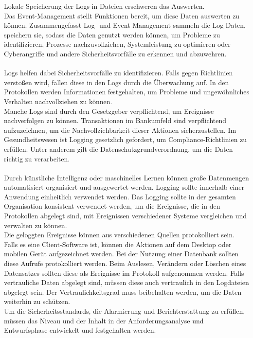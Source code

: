 Lokale Speicherung der Logs in Dateien erschweren das Auswerten.
\\
Das Event-Management stellt Funktionen bereit, um diese Daten auswerten zu können.
Zusammengefasst Log- und Event-Management sammeln die Log-Daten, speichern sie, sodass die Daten genutzt werden können, um Probleme zu identifizieren, Prozesse nachzuvollziehen, Systemleistung zu optimieren oder Cyberangriffe und andere Sicherheitsvorfälle zu erkennen und abzuwehren.
\\
\\
Logs helfen dabei Sicherheitsvorfälle zu identifizieren.
Falls gegen Richtlinien verstoßen wird, fallen diese in den Logs durch die Überwachung auf.
In den Protokollen werden Informationen festgehalten, um Probleme und ungewöhnliches Verhalten nachvollziehen zu können.
\\
Manche Logs sind durch den Gesetzgeber verpflichtend, um Ereignisse nachverfolgen zu können.
Transaktionen im Bankumfeld sind verpflichtend aufzuzeichnen, um die Nachvollziehbarkeit dieser Aktionen sicherzustellen.
Im Gesundheitswesen ist Logging gesetzlich gefordert, um Compliance-Richtlinien zu erfüllen.
Unter anderem gilt die Datenschutzgrundverordnung, um die Daten richtig zu verarbeiten.
\\
\\
Durch künstliche Intelligenz oder maschinelles Lernen können große Datenmengen automatisiert organisiert und ausgewertet werden.
Logging sollte innerhalb einer Anwendung einheitlich verwendet werden.
Das Logging sollte in der gesamten Organisation konsistent verwendet werden, um die Ereignisse, die in den Protokollen abgelegt sind, mit Ereignissen verschiedener Systeme vergleichen und verwalten zu können.
\\
Die geloggten Ereignisse können aus verschiedenen Quellen protokolliert sein.
Falls es eine Client-Software ist, können die Aktionen auf dem Desktop oder mobilen Gerät aufgezeichnet werden.
Bei der Nutzung einer Datenbank sollten diese Aufrufe protokolliert werden.
Beim Auslesen, Verändern oder Löschen eines Datensatzes sollten diese als Ereignisse im Protokoll aufgenommen werden.
Falls vertrauliche Daten abgelegt sind, müssen diese auch vertraulich in den Logdateien abgelegt sein.
Der Vertraulichkeitsgrad muss beibehalten werden, um die Daten weiterhin zu schützen.
\\
Um die Sicherheitsstandards, die Alarmierung und Berichterstattung zu erfüllen, müssen das Niveau und der Inhalt in der Anforderungsanalyse und Entwurfsphase entwickelt und festgehalten werden.
